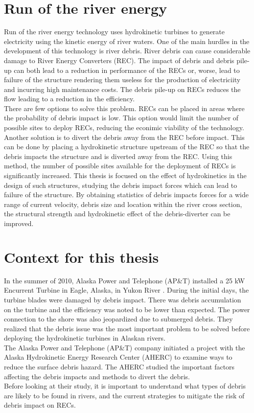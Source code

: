 \section{Run of the river energy}
Run of the river energy technology uses hydrokinetic turbines to generate electricity using the kinetic energy of river waters. One of the main hurdles in the development of this technology is river debris. River debris can cause considerable damage to River Energy Converters (REC). The impact of debris and debris pile-up can both lead to a reduction in performance of the RECs or, worse, lead to failure of the structure rendering them useless for the production of electriciity and incurring high maintenance costs. The debris pile-up on RECs reduces the flow leading to a reduction in the efficiency.\\
There are few options to solve this problem. RECs can be placed in areas where the probability of debris impact is low. This option would limit the number of possible sites to deploy RECs, reducing the econimic viability of the technology.  Another solution is to divert the debris away from the REC before impact. This can be done by placing a hydrokinetic structure upstream of the REC so that the debris impacts the structure and is diverted away from the REC. Using this method, the number of possible sites available for the deployment of RECs is significantly increased. This thesis is focused on the effect of hydrokinetics in the design of such structures, studying the debris impact forces which can lead to failure of the structure. By obtaining statistics of debris impacts forces for a wide range of current velocity, debris size and location within the river cross section, the structural strength and hydrokinetic effect of the debris-diverter can be improved.

\section{Context for this thesis} 
In the summer of 2010, Alaska Power and Telephone (AP\&T) installed a 25 kW Encurrent Turbine in Eagle, Alaska, in Yukon River \cite{Reference1}. During the initial days, the turbine blades were damaged by debris impact. There was debris accumulation on the turbine and the efficiency was noted to be lower than expected. The power connection to the shore was also jeopardized due to submerged debris. They realized that the debris issue was the most important problem to be solved before deploying the hydrokinetic turbines in Alaskan rivers.\\
The Alaska Power and Telephone (AP\&T) company initiated a project with the Alaska Hydrokinetic Energy Research Center (AHERC) to examine ways to reduce the surface debris hazard. The AHERC studied the important factors affecting the debris impacts and methods to divert the debris.\\
Before looking at their study, it is important to understand what types of debris are likely to be found in rivers, and the current strategies to mitigate the risk of debris impact on RECs.

